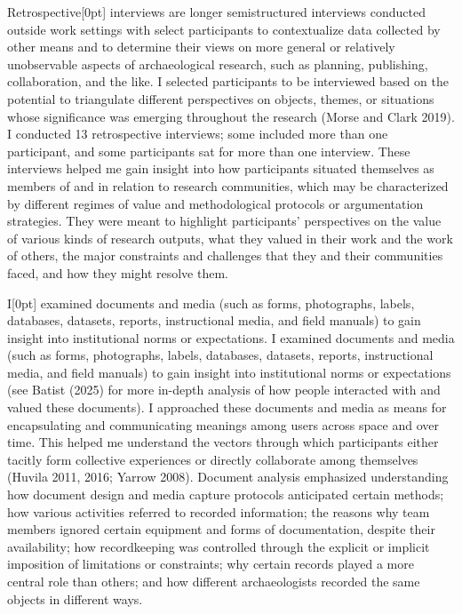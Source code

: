 \documentclass[
]{article}
\newcommand{\paragraphnumber}[1]{\marginnote{\color{lightgray}\tiny{#1}}[0pt]}
\begin{document}
Retrospective\paragraphnumber{[18]} interviews are longer semistructured
interviews conducted outside work settings with select participants to
contextualize data collected by other means and to determine their views
on more general or relatively unobservable aspects of archaeological
research, such as planning, publishing, collaboration, and the like. I
selected participants to be interviewed based on the potential to
triangulate different perspectives on objects, themes, or situations
whose significance was emerging throughout the research (Morse and Clark
2019). I conducted 13 retrospective interviews; some included more than
one participant, and some participants sat for more than one interview.
These interviews helped me gain insight into how participants situated
themselves as members of and in relation to research communities, which
may be characterized by different regimes of value and methodological
protocols or argumentation strategies. They were meant to highlight
participants' perspectives on the value of various kinds of research
outputs, what they valued in their work and the work of others, the
major constraints and challenges that they and their communities faced,
and how they might resolve them.

I\paragraphnumber{[19]} examined documents and media (such as forms,
photographs, labels, databases, datasets, reports, instructional media,
and field manuals) to gain insight into institutional norms or
expectations. I examined documents and media (such as forms,
photographs, labels, databases, datasets, reports, instructional media,
and field manuals) to gain insight into institutional norms or
expectations (see Batist (2025) for more in-depth analysis of how people
interacted with and valued these documents). I approached these
documents and media as means for encapsulating and communicating
meanings among users across space and over time. This helped me
understand the vectors through which participants either tacitly form
collective experiences or directly collaborate among themselves (Huvila
2011, 2016; Yarrow 2008). Document analysis emphasized understanding how
document design and media capture protocols anticipated certain methods;
how various activities referred to recorded information; the reasons why
team members ignored certain equipment and forms of documentation,
despite their availability; how recordkeeping was controlled through the
explicit or implicit imposition of limitations or constraints; why
certain records played a more central role than others; and how
different archaeologists recorded the same objects in different ways.
\end{document}
